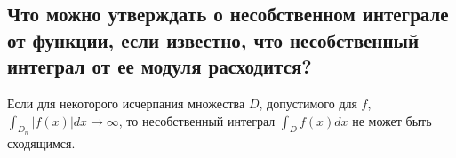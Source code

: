 
\subsection{Что можно утверждать о несобственном интеграле от функции, если известно, что несобственный интеграл от ее модуля расходится?}
Если для некоторого исчерпания множества $D$, допустимого для $f$, $\int_{D_n} |f(x)| dx \rightarrow \infty$, то несобственный интеграл $\int_{D} f(x) dx$ не может быть сходящимся.

